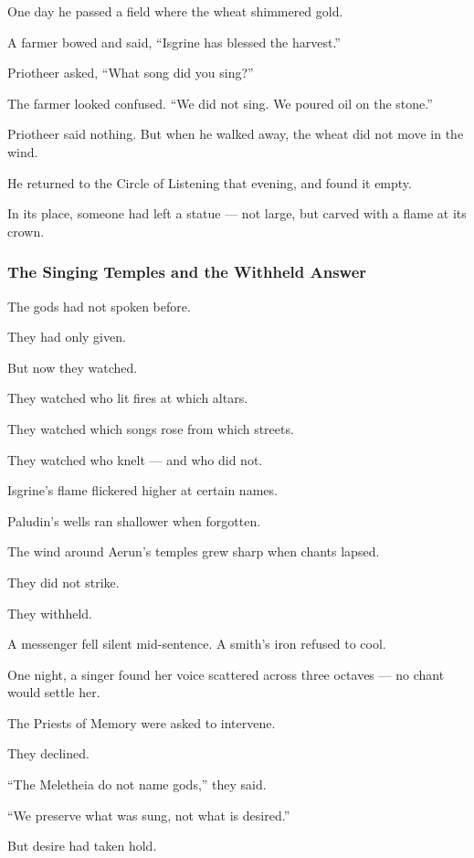 \documentclass[12pt]{article}
\begin{document}
One day he passed a field where the wheat shimmered gold.  

A farmer bowed and said, “Isgrine has blessed the harvest.”

Priotheer asked,  
“What song did you sing?”

The farmer looked confused.  
“We did not sing. We poured oil on the stone.”

Priotheer said nothing.  
But when he walked away, the wheat did not move in the wind.

He returned to the Circle of Listening that evening, and found it empty.

In its place, someone had left a statue — not large,  
but carved with a flame at its crown.

\dotfill

\subsubsection{The Singing Temples and the Withheld Answer}

The gods had not spoken before.

They had only given.

But now they watched.

They watched who lit fires at which altars.  

They watched which songs rose from which streets.  

They watched who knelt — and who did not.

Isgrine’s flame flickered higher at certain names.  

Paludin’s wells ran shallower when forgotten. 

The wind around Aerun’s temples grew sharp when chants lapsed.

They did not strike.  

They withheld.

A messenger fell silent mid-sentence.  
A smith’s iron refused to cool.  

One night, a singer found her voice scattered across three octaves — no chant would settle her.

The Priests of Memory were asked to intervene. 

They declined.  

 “The Meletheia do not name gods,” they said. 
 
 “We preserve what was sung, not what is desired.”

But desire had taken hold.
\end{document}
